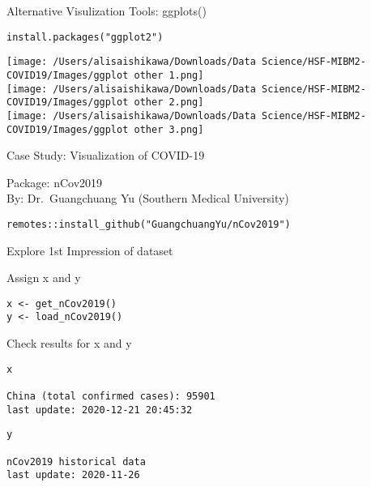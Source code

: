 \documentclass[
  ignorenonframetext,
]{beamer}
\begin{document}
\begin{frame}[fragile]{Alternative Visulization Tools: ggplots()}
\protect\hypertarget{alternative-visulization-tools-ggplots}{}

\begin{verbatim}
install.packages("ggplot2")
\end{verbatim}

\texttt{[image: /Users/alisaishikawa/Downloads/Data Science/HSF-MIBM2-COVID19/Images/ggplot other 1.png]}\\
\texttt{[image: /Users/alisaishikawa/Downloads/Data Science/HSF-MIBM2-COVID19/Images/ggplot other 2.png]}\\
\texttt{[image: /Users/alisaishikawa/Downloads/Data Science/HSF-MIBM2-COVID19/Images/ggplot other 3.png]}

\end{frame}

\begin{frame}[fragile]{Case Study: Visualization of COVID-19}
\protect\hypertarget{case-study-visualization-of-covid-19}{}

Package: nCov2019\\
By: Dr.~Guangchuang Yu (Southern Medical University)

\begin{verbatim}
remotes::install_github("GuangchuangYu/nCov2019")  
\end{verbatim}

\begin{block}{Explore 1st Impression of dataset}

Assign x and y

\begin{verbatim}
x <- get_nCov2019()
y <- load_nCov2019()
\end{verbatim}

Check results for x and y

\begin{verbatim}
x
  
China (total confirmed cases): 95901
last update: 2020-12-21 20:45:32
\end{verbatim}

\begin{verbatim}
y
  
nCov2019 historical data 
last update: 2020-11-26 
\end{verbatim}

\end{block}

\end{frame}
\end{document}
